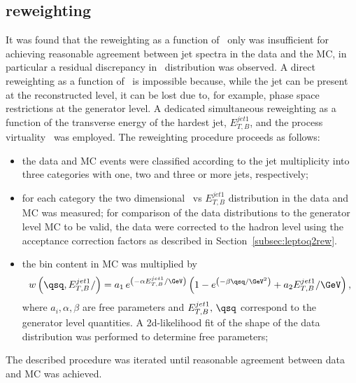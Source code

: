 \subsection{\ariadne reweighting}
\label{subsec:ariadneq2rew}
It was found that the reweighting as a function of \qsq~only was insufficient for achieving reasonable agreement between jet spectra in the data and the \ariadne MC, in particular a residual discrepancy in \etjetb~distribution was observed. A direct reweighting as a function of \etjetb~is impossible because, while the jet can be present at the reconstructed level, it can be lost due to, for example, phase space restrictions at the generator level. A dedicated simultaneous reweighting as a function of the transverse energy of the hardest jet, $E_{T,B}^{jet1}$, and the process virtuality \qsq~was employed. The reweighting procedure proceeds as follows:
\begin{itemize}
	\item the data and MC events were classified according to the jet multiplicity into three categories with one, two and three or more jets, respectively;
	\item for each category the two dimensional \qsq~vs $E_{T,B}^{jet1}$ distribution in the data and MC was measured; for comparison of the data distributions to the generator level MC to be valid, the data were corrected to the hadron level using the acceptance correction factors as described in Section~\ref{subsec:leptoq2rew}.
	\item the bin content in MC was multiplied by 
	\begin{equation}
		w\left( \qsq, E_{T,B}^{jet1}/ \right)=a_1\,e^{\left( -\alpha E_{T,B}^{jet1}/\GeV\right) }\left(1- e^{\left( -\beta\qsq/\GeV^2\right) } + a_2 E_{T,B}^{jet1}/\GeV \right),
		\end{equation}
where $a_i, \alpha, \beta$ are free parameters and $E_{T,B}^{jet1},\,\qsq$ correspond to the generator level quantities. A 2d-likelihood fit of the shape of the data distribution was performed to determine free parameters;
\end{itemize}
The described procedure was iterated until reasonable agreement between data and MC was achieved. 


